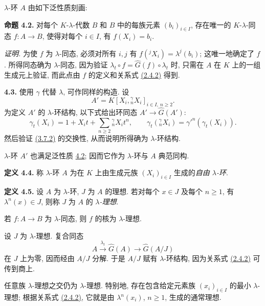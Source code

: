 \(\lambda\)-环 \(A\) 由如下泛性质刻画:

\textbf{命题 4.2.} 对每个 \(K\)-\(\lambda\)-代数 \(B\) 和 \(B\) 中的每族元素 \((b_i)_{i\in I}\), 存在唯一的 \(K\)-\(\lambda\)-同态 \(f:A\to B\), 使得对每个 \(i\in I\), 有 \(f(X_i)=b_i\).

\emph{证明.} 为使 \(f\) 为 \(\lambda\)-同态, 必须对所有 \(i,j\) 有 \(f({}^jX_i)=\lambda^j(b_i)\); 这唯一地确定了 \(f\). 所得同态确为 \(\lambda\)-同态, 因为验证 \(\lambda_t\circ f=\widehat G(f)\circ\lambda_t\) 时, 只需在 \(A\) 在 \(K\) 上的一组生成元上验证, 而此点由 \(f\) 的定义和关系式 \hyperlink{sga6.e05.eq.2-4-2}{(2.4.2)} 得到.

\textbf{4.3.} 使用 \(\gamma\) 代替 \(\lambda\), 可作同样的构造. 设
\[
 A'=K[X_i,{}^\gamma_nX_i]_{i\in I,\ n\ge2}.
\]
为定义 \(A'\) 的 \(\lambda\)-环结构, 以下式给出环同态 \(A'\to\widehat G(A')\):
\begin{equation}\tag{4.3.1}
 \gamma_t(X_i)=1+X_it+\sum_{n\ge2}{}^\gamma_nX_i t^n,
 \qquad
 \gamma_t({}^\gamma_nX_i)=\gamma'^n(\gamma_t(X_i)).
\end{equation}
然后验证 \hyperlink{sga6.e05.eq.3-7-2}{(3.7.2)} 的交换性, 从而说明所得确为 \(\lambda\)-环结构.

\(\lambda\)-环 \(A'\) 也满足泛性质 \hyperlink{sga6.e05.prop.4-2}{4.2}; 因而它作为 \(\lambda\)-环与 \(A\) 典范同构.

\textbf{定义 4.4.} 称 \(\lambda\)-环 \(A\) 为在 \(K\) 上由生成元族 \((X_i)_{i\in I}\) 生成的\emph{自由 \(\lambda\)-环}.

\textbf{定义 4.5.} 设 \(A\) 为 \(\lambda\)-环, \(J\) 为 \(A\) 的理想. 若对每个 \(x\in J\) 及每个 \(n\ge1\), 有 \(\lambda^n(x)\in J\), 则称 \(J\) 为 \(A\) 的 \emph{\(\lambda\)-理想}.

若 \(f:A\to B\) 为 \(\lambda\)-同态, 则 \(f\) 的核为 \(\lambda\)-理想.

设 \(J\) 为 \(\lambda\)-理想. 复合同态
\[
 A\xrightarrow{\lambda_t}\widehat G(A)\longrightarrow\widehat G(A/J)
\]
在 \(J\) 上为零, 因而经由 \(A/J\) 分解. 于是 \(A/J\) 赋有 \(\lambda\)-环结构, 因为关系式 \hyperlink{sga6.e05.eq.2-4-2}{(2.4.2)} 可传到商上.

任意族 \(\lambda\)-理想之交仍为 \(\lambda\)-理想. 特别地, 存在包含给定元素族 \((x_i)_{i\in I}\) 的最小 \(\lambda\)-理想; 根据关系式 \hyperlink{sga6.e05.eq.2-4-2}{(2.4.2)}, 它就是由 \(\lambda^n(x_i)\), \(n\ge1\), 生成的通常理想.


